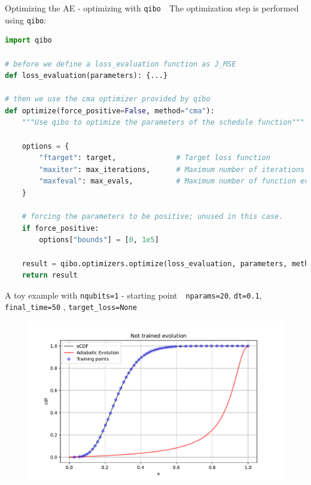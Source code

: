 \documentclass[8pt, xcolor={svgnames}, hyperref={colorlinks, linkcolor=black, citecolor=amethyst, urlcolor=amethyst}]{beamer}
\begin{document}
\begin{frame}[fragile]{Optimizing the AE - optimizing with \texttt{qibo}}
\large
\faArrowCircleRight\,\, The optimization step is performed using \texttt{qibo}:
\begin{tcolorbox}
\begin{lstlisting}[language=Python]
import qibo 

# before we define a loss_evaluation function as J_MSE
def loss_evaluation(parameters): {...}

# then we use the cma optimizer provided by qibo
def optimize(force_positive=False, method="cma"):
    """Use qibo to optimize the parameters of the schedule function"""

    options = {
        "ftarget": target,              # Target loss function
        "maxiter": max_iterations,      # Maximum number of iterations
        "maxfeval": max_evals,          # Maximum number of function evaluations
    }
    
    # forcing the parameters to be positive; unused in this case.
    if force_positive:
        options["bounds"] = [0, 1e5]
        
    result = qibo.optimizers.optimize(loss_evaluation, parameters, method=method, options=options)
    return result
\end{lstlisting}
\end{tcolorbox}
\end{frame}


\begin{frame}[fragile]{A toy example with \texttt{nqubits=1} - starting point}
\large
\faArrowCircleRight\,\, \texttt{nparams=20}, \texttt{dt=0.1}, \texttt{final\_time=50}
, \texttt{target\_loss=None}
\begin{figure}
    \includegraphics[width=1\textwidth]{figures/ev0.pdf}
\end{figure}
\end{frame}
\end{document}
